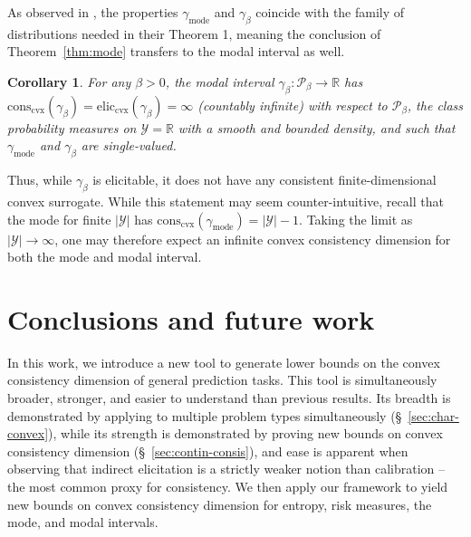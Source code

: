 \documentclass[11pt]{article} %
\newcommand{\Comments}{1}
\newcommand{\mynote}[2]{\ifnum\Comments=1\textcolor{#1}{#2}\fi}
\newcommand{\jessie}[1]{\mynote{teal}{[JF: #1]}}
\newcommand{\reals}{\mathbb{R}}
\newcommand{\eliccvx}{\mathrm{elic}_\mathrm{cvx}}
\newcommand{\conscvx}{\mathrm{cons}_\mathrm{cvx}}
\renewcommand{\P}{\mathcal{P}}
\newcommand{\Y}{\mathcal{Y}}
\newcommand{\mode}{\gamma_{\mathrm{mode}}}
\newcommand{\modal}{\gamma_\beta}
\newtheorem{corollary}{Corollary}
\begin{document}
As observed in \citet[Corollary 1]{dearborn2020indirect}, the properties $\mode$ and $\modal$ coincide with the family of distributions needed in their Theorem 1, meaning the conclusion of Theorem~\ref{thm:mode} transfers to the modal interval as well.
\begin{corollary}\label{cor:modal-interval}
  For any $\beta > 0$, the modal interval $\modal: \P_\beta \to \reals$ has  $\conscvx(\modal) = \eliccvx(\modal) = \infty$ (countably infinite) with respect to $\P_\beta$, the class probability measures on $\Y=\reals$ with a smooth and bounded density, and such that $\mode$ and $\modal$ are single-valued.
\end{corollary}

Thus, while $\modal$ is elicitable, it does not have any consistent finite-dimensional convex surrogate.
While this statement may seem counter-intuitive, recall that the mode for finite $|\Y|$ has $\conscvx(\mode)=|\Y|-1$.
Taking the limit as $|\Y|\to\infty$, one may therefore expect an infinite convex consistency dimension for both the mode and modal interval.


\section{Conclusions and future work}\label{sec:conclusions}
In this work, we introduce a new tool to generate lower bounds on the convex consistency dimension of general prediction tasks.
This tool is simultaneously broader, stronger, and easier to understand than previous results.
Its breadth is demonstrated by applying to multiple problem types simultaneously (\S~\ref{sec:char-convex}), while its strength is demonstrated by proving new bounds on convex consistency dimension (\S~\ref{sec:contin-consis}), and ease is apparent when observing that indirect elicitation is a strictly weaker notion than calibration -- the most common proxy for consistency.
We then apply our framework to yield new bounds on convex consistency dimension for entropy, risk measures, the mode, and modal intervals.
\end{document}

